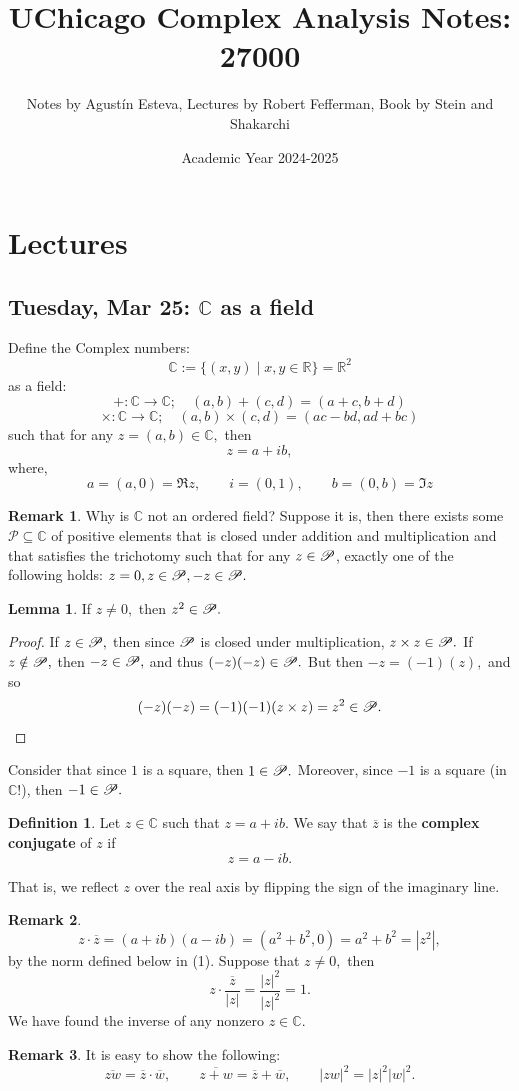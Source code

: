 \documentclass[10pt, oneside]{article}
\title{UChicago Complex Analysis Notes: 27000}
\author{Notes by Agustín Esteva, Lectures by Robert Fefferman, Book by Stein and Shakarchi}
\date{Academic Year 2024-2025}
\newcommand{\bbR}{\mathbb{R}}
\newcommand{\bbC}{\mathbb{C}}
\theoremstyle{definition}
\newtheorem{defn}{Definition}
\newtheorem{rem}{Remark}
\newtheorem{lem}{Lemma}
\begin{document}
\maketitle
\tableofcontents

\vspace{.25in}


\newpage
\section{Lectures}

\subsection{Tuesday, Mar 25: $\bbC$ as a field}
Define the Complex numbers:
\[\bbC := \{(x,y) \; | \; x,y \in \bbR\} = \bbR^2\] as a field: 
\[+: \bbC \to \bbC; \quad (a,b) + (c,d) = (a + c, b + d)\]
\[\times: \bbC \to \bbC; \quad (a,b)\times (c,d) = (ac - bd, ad + bc)\] such that for any $z = (a,b) \in \bbC,$ then 
\[z = a + ib,\] where, 
\[a = (a,0) = \Re{z}, \qquad i = (0,1), \qquad b = (0,b) = \Im{z}\]

\begin{rem}
    Why is $\bbC$ not an ordered field? Suppose it is, then there exists some $\mathcal{P}\subseteq \bbC$ of positive elements that is closed under addition and multiplication and that satisfies the trichotomy such that for any $z\in \cal P$, exactly one of the following holds: $z = 0, z\in \mathcal{P}, -z\in \cal P.$ 
    \begin{lem}
        If $z \neq 0,$ then $z^2 \in \cal P.$
    \end{lem}
    \begin{proof}
        If $z\in \cal P,$ then since $\cal P$ is closed under multiplication, $z \times z \in \cal P.$
        If $z\notin \cal P,$ then $-z \in \cal P,$ and thus $(-z)(-z) \in \cal P.$ But then $-z = (-1)(z),$ and so 
        \[(-z)(-z)= (-1)(-1)(z \times z) = z^2 \in \cal P.\]
    \end{proof}
    Consider that since $1$ is a square, then $1 \in \cal P.$ Moreover, since $-1$ is a square (in $\bbC!$), then $-1 \in \cal P.$  
\end{rem}

\begin{defn}
    Let $z\in \bbC$ such that $z = a + ib.$ We say that $\overline{z}$ is the \textbf{complex conjugate} of $z$ if 
    \[ z = a - ib.\]
\end{defn}
That is, we reflect $z$ over the real axis by flipping the sign of the imaginary line. 
\begin{rem}
    \[z \cdot \overline{z} = (a + ib)(a-ib) = (a^2 + b^2, 0) = a^2 + b^2 = |z^2|,\] by the norm defined below in (1). Suppose that $z\neq 0,$ then 
    \[z \cdot \frac{\overline{z}}{|z|} = \frac{|z|^2}{|z|^2} = 1.\] We have found the inverse of any nonzero $z\in \bbC.$ 
\end{rem}
\begin{rem}
It is easy to show the following:
    \[\overline{zw} = \overline{z} \cdot \overline{w}, \qquad  \overline{z + w} = \overline{z} + \overline{w}, \qquad |zw|^2 = |z|^2|w|^2.\]
\end{rem}
\end{document}
